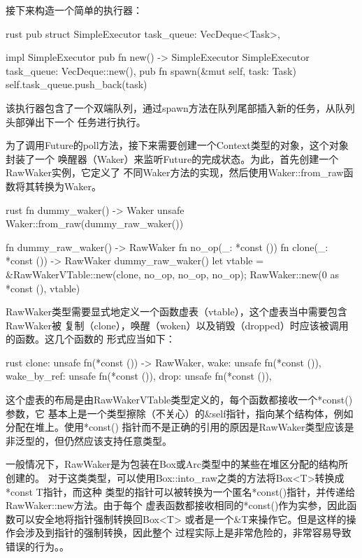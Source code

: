 接下来构造一个简单的执行器：
\begin{code-block}{rust}
pub struct SimpleExecutor {
    task_queue: VecDeque<Task>,
}

impl SimpleExecutor {
    pub fn new() -> SimpleExecutor {
        SimpleExecutor {
            task_queue: VecDeque::new(),
        }
    }
    pub fn spawn(&mut self, task: Task) {
        self.task_queue.push_back(task)
    }
}
\end{code-block}
该执行器包含了一个双端队列，通过spawn方法在队列尾部插入新的任务，从队列头部弹出下一个
任务进行执行。

为了调用Future的poll方法，接下来需要创建一个Context类型的对象，这个对象封装了一个
唤醒器（Waker）来监听Future的完成状态。为此，首先创建一个RawWaker实例，它定义了
不同Waker方法的实现，然后使用Waker::from\_raw函数将其转换为Waker。
\begin{code-block}{rust}
fn dummy_waker() -> Waker {
    unsafe { Waker::from_raw(dummy_raw_waker()) }
}

fn dummy_raw_waker() -> RawWaker {
    fn no_op(_: *const ()) {}
    fn clone(_: *const ()) -> RawWaker {
        dummy_raw_waker()
    }
    let vtable = &RawWakerVTable::new(clone, no_op, no_op, no_op);
    RawWaker::new(0 as *const (), vtable)
}
\end{code-block}

RawWaker类型需要显式地定义一个函数虚表（vtable），这个虚表当中需要包含RawWaker被
复制（clone），唤醒（woken）以及销毁（dropped）时应该被调用的函数。这几个函数的
形式应当如下：
\begin{code-block}{rust}
clone: unsafe fn(*const ()) -> RawWaker,
wake: unsafe fn(*const ()),
wake_by_ref: unsafe fn(*const ()),
drop: unsafe fn(*const ()),
\end{code-block}
这个虚表的布局是由RawWakerVTable类型定义的，每个函数都接收一个*const()参数，它
基本上是一个类型擦除（不关心）的\&self指针，指向某个结构体，例如分配在堆上。使用*const()
指针而不是正确的引用的原因是RawWaker类型应该是非泛型的，但仍然应该支持任意类型。

一般情况下，RawWaker是为包装在Box或Arc类型中的某些在堆区分配的结构所创建的。
对于这类类型，可以使用Box::into\_raw之类的方法将Box<T>转换成*const T指针，而这种
类型的指针可以被转换为一个匿名*const()指针，并传递给RawWaker::new方法。由于每个
虚表函数都接收相同的*const()作为实参，因此函数可以安全地将指针强制转换回Box<T>
或者是一个\&T来操作它。但是这样的操作会涉及到指针的强制转换，因此整个
过程实际上是非常危险的，非常容易导致错误的行为。。

